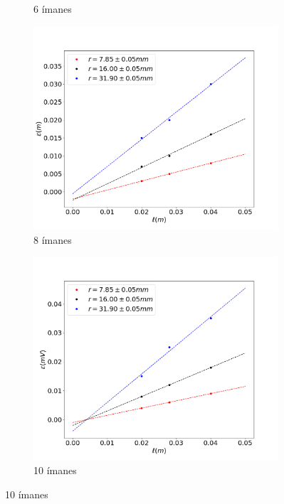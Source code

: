 \documentclass[11pt]{report}
\begin{document}
\begin{figure}[H]
\begin{subfigure}{.5\textwidth}
  \caption{6 ímanes}
  \label{fig:sub2}
\end{subfigure}
\begin{subfigure}{.5\textwidth}
  \centering
  \includegraphics[width=1\linewidth]{i8lfem.png}
  \caption{8 ímanes}
  \label{fig:sub2}
\end{subfigure}%
\begin{subfigure}{.5\textwidth}
  \centering
  \includegraphics[width=1\linewidth]{i10lfem.png}
  \caption{10 ímanes}
  \label{fig:sub2}
\end{subfigure}

\end{figure}
\end{document}

